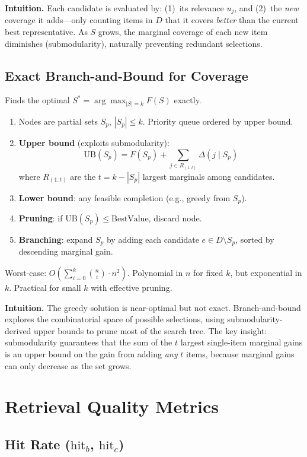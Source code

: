 \documentclass[11pt,a4paper]{article}
\begin{document}
\textbf{Intuition.} Each candidate is evaluated by: (1)~its relevance $u_j$, and (2)~the \emph{new} coverage it adds---only counting items in $D$ that it covers \emph{better} than the current best representative. As $S$ grows, the marginal coverage of each new item diminishes (submodularity), naturally preventing redundant selections.

\subsection{Exact Branch-and-Bound for Coverage}

Finds the optimal $S^* = \arg\max_{|S|=k} F(S)$ exactly.

\begin{enumerate}
	\item Nodes are partial sets $S_p$, $|S_p| \leq k$. Priority queue ordered by upper bound.
	\item \textbf{Upper bound} (exploits submodularity):
	      \[
		      \mathrm{UB}(S_p) = F(S_p) + \sum_{j \in R_{(1:t)}} \Delta(j \mid S_p)
	      \]
	      where $R_{(1:t)}$ are the $t = k - |S_p|$ largest marginals among candidates.
	\item \textbf{Lower bound}: any feasible completion (e.g., greedy from $S_p$).
	\item \textbf{Pruning}: if $\mathrm{UB}(S_p) \leq \mathrm{BestValue}$, discard node.
	\item \textbf{Branching}: expand $S_p$ by adding each candidate $e \in D \setminus S_p$, sorted by descending marginal gain.
\end{enumerate}
Worst-case: $O\!\left(\sum_{i=0}^{k} \binom{n}{i} \cdot n^2\right)$. Polynomial in $n$ for fixed $k$, but exponential in $k$. Practical for small $k$ with effective pruning.

\textbf{Intuition.} The greedy solution is near-optimal but not exact. Branch-and-bound explores the combinatorial space of possible selections, using submodularity-derived upper bounds to prune most of the search tree. The key insight: submodularity guarantees that the sum of the $t$ largest single-item marginal gains is an upper bound on the gain from adding \emph{any} $t$ items, because marginal gains can only decrease as the set grows.

\section{Retrieval Quality Metrics}

\subsection{\texorpdfstring{Hit Rate ($\mathrm{hit}_b$, $\mathrm{hit}_c$)}{Hit Rate (hit\_b, hit\_c)}}
\end{document}
